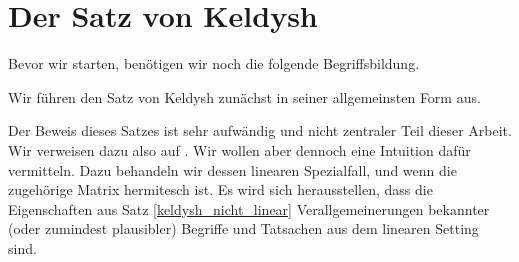 \section{Der Satz von Keldysh}

Bevor wir starten, benötigen wir noch die folgende Begriffsbildung.



Wir führen den Satz von Keldysh zunächst in seiner allgemeinsten Form aus.



Der Beweis dieses Satzes ist sehr aufwändig und nicht zentraler Teil dieser Arbeit.
Wir verweisen dazu also auf \cite{BEYN20123839}.
Wir wollen aber dennoch eine Intuition dafür vermitteln.
Dazu behandeln wir dessen linearen Spezialfall, und wenn die zugehörige Matrix hermitesch ist.
Es wird sich herausstellen, dass die Eigenschaften aus Satz \ref{keldysh_nicht_linear} Verallgemeinerungen bekannter (oder zumindest plausibler) Begriffe und Tatsachen aus dem linearen Setting sind.






% 
% 


